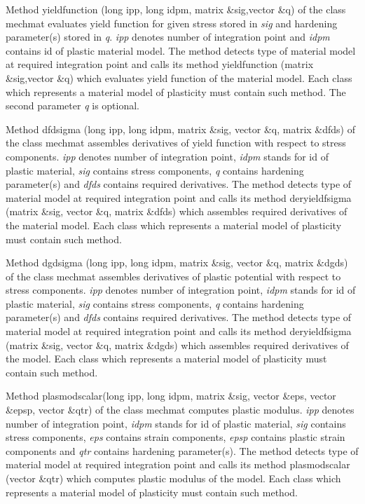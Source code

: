 Method {\sf yieldfunction (long ipp, long idpm, matrix \&sig,vector \&q)} of the class {\sf mechmat} evaluates
yield function for given stress stored in {\it sig} and hardening parameter(s) stored in {\it q}. {\it ipp} denotes
number of integration point and {\it idpm} contains id of plastic material model. The method detects type of
material model at required integration point and calls its method {\sf yieldfunction (matrix \&sig,vector \&q)}
which evaluates yield function of the material model. Each class which represents a material model of plasticity
must contain such method. The second parameter {\it q} is optional.

Method {\sf dfdsigma (long ipp, long idpm, matrix \&sig, vector \&q, matrix \&dfds)} of the class {\sf mechmat}
assembles derivatives of yield function with respect to stress components. {\it ipp} denotes number of integration
point, {\it idpm} stands for id of plastic material, {\it sig} contains stress components, {\it q} contains hardening
parameter(s) and {\it dfds} contains required derivatives. The method detects type of material model at required
integration point and calls its method {\sf deryieldfsigma (matrix \&sig, vector \&q, matrix \&dfds)} which
assembles required derivatives of the material model. Each class which represents a material model of plasticity
must contain such method.

Method {\sf dgdsigma (long ipp, long idpm, matrix \&sig, vector \&q, matrix \&dgds)} of the class {\sf mechmat}
assembles derivatives of plastic potential with respect to stress components. {\it ipp} denotes number of
integration point, {\it idpm} stands for id of plastic material, {\it sig} contains stress components, {\it q}
contains hardening parameter(s) and {\it dfds} contains required derivatives. The method detects type of material
model at required integration point and calls its method {\sf deryieldfsigma (matrix \&sig, vector \&q, matrix \&dgds)}
which assembles required derivatives of the model. Each class which represents a material model of plasticity
must contain such method.

Method {\sf plasmodscalar(long ipp, long idpm, matrix \&sig, vector \&eps, vector \&epsp, vector \&qtr)}
of the class {\sf mechmat} computes plastic modulus. {\it ipp} denotes number of integration point, {\it idpm}
stands for id of plastic material, {\it sig} contains stress components, {\it eps} contains strain components,
{\it epsp} contains plastic strain components and {\it qtr} contains hardening parameter(s). The method detects
type of material model at required integration point and calls its method {\sf plasmodscalar (vector \&qtr)}
which computes plastic modulus of the model. Each class which represents a material model of plasticity must
contain such method.

